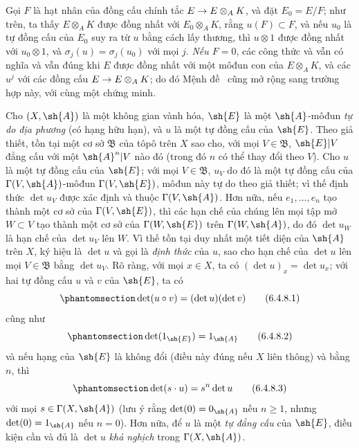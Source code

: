 \documentclass[oneside,10pt]{amsart}
\makeatletter
\renewcommand{\geq}{\geqslant}
\newcommand{\ega@arrow}[2]{\mathchoice{#1}{#2}{#2}{#2}}
\renewcommand{\to}{\ega@arrow{\longrightarrow}{\rightarrow}}
\let\EGAOriginalLabel\label
\renewcommand{\label}[1]{\phantomsection\EGAOriginalLabel{#1}}
\makeatother
\begin{document}
\begin{remark}[6.4.7]
Gọi $F$ là hạt nhân của đồng cấu chính tắc $E\to E\otimes_A K$, và đặt $E_0=E/F$;
như trên, ta thấy $E\otimes_A K$ được đồng nhất với $E_0\otimes_A K$, rằng $u(F)\subset F$, và nếu $u_0$ là tự đồng cấu của $E_0$ suy ra từ $u$ bằng cách lấy thương, thì $u\otimes1$ được đồng nhất với $u_0\otimes1$, và $\sigma_j(u)=\sigma_j(u_0)$ với mọi $j$.
\emph{Nếu $F=0$}, các công thức  và  vẫn có nghĩa và vẫn đúng khi $E$ được đồng nhất với một môđun con của $E\otimes_A K$, và các $u^j$ với các đồng cấu $E\to E\otimes_A K$;
do đó Mệnh đề~ cũng mở rộng sang trường hợp này, với cùng một chứng minh.
\end{remark}

\begin{env}[6.4.8]
\label{II.6.4.8}
Cho $(X,\sh{A})$ là một không gian vành hóa, $\sh{E}$ là một $\sh{A}$-môđun \emph{tự do địa phương} (có hạng hữu hạn), và $u$ là một tự đồng cấu của $\sh{E}$.
Theo giả thiết, tồn tại một cơ sở $\mathfrak{B}$ của tôpô trên $X$ sao cho, với mọi $V\in\mathfrak{B}$, $\sh{E}|V$ đẳng cấu với một $\sh{A}^n|V$ nào đó (trong đó $n$ có thể thay đổi theo $V$).
Cho $u$ là một tự đồng cấu của $\sh{E}$;
với mọi $V\in\mathfrak{B}$, $u_V$ do đó là một tự đồng cấu của $\Gamma(V,\sh{A})$-môđun $\Gamma(V,\sh{E})$, môđun này tự do theo giả thiết;
vì thế định thức $\det u_V$ được xác định và thuộc $\Gamma(V,\sh{A})$.
Hơn nữa, nếu $e_1,\ldots,e_n$ tạo thành một cơ sở của $\Gamma(V,\sh{E})$, thì các hạn chế của chúng lên mọi tập mở $W\subset V$ tạo thành một cơ sở của $\Gamma(W,\sh{E})$ trên $\Gamma(W,\sh{A})$, do đó $\det u_W$ là hạn chế của $\det u_V$ lên $W$.
Vì thế tồn tại duy nhất một tiết diện của $\sh{A}$ trên $X$, ký hiệu là $\det u$ và gọi là \emph{định thức} của $u$, sao cho hạn chế của $\det u$ lên mọi $V\in\mathfrak{B}$ bằng $\det u_V$.
Rõ ràng, với mọi $x\in X$, ta có $(\det u)_x=\det u_x$;
với hai tự đồng cấu $u$ và $v$ của $\sh{E}$, ta có
\[
\label{II.6.4.8.1}
  \det(u\circ v) = (\det u)(\det v)
\tag{6.4.8.1}
\]
cũng như
\[
\label{II.6.4.8.2}
  \det(1_{\sh{E}}) = 1_{\sh{A}}
\tag{6.4.8.2}
\]
và nếu hạng của $\sh{E}$ là không đổi (điều này đúng  nếu $X$ liên thông) và bằng $n$, thì
\[
\label{II.6.4.8.3}
  \det(s\cdot u) = s^n\det u
\tag{6.4.8.3}
\]
với mọi $s\in\Gamma(X,\sh{A})$ (lưu ý rằng $\det(0)=0_{\sh{A}}$ nếu $n\geq1$, nhưng $\det(0)=1_{\sh{A}}$ nếu $n=0$).
Hơn nữa, để $u$ là một \emph{tự đẳng cấu} của $\sh{E}$, điều kiện cần và đủ là $\det u$ \emph{khả nghịch} trong $\Gamma(X,\sh{A})$.


\end{env}
\end{document}
